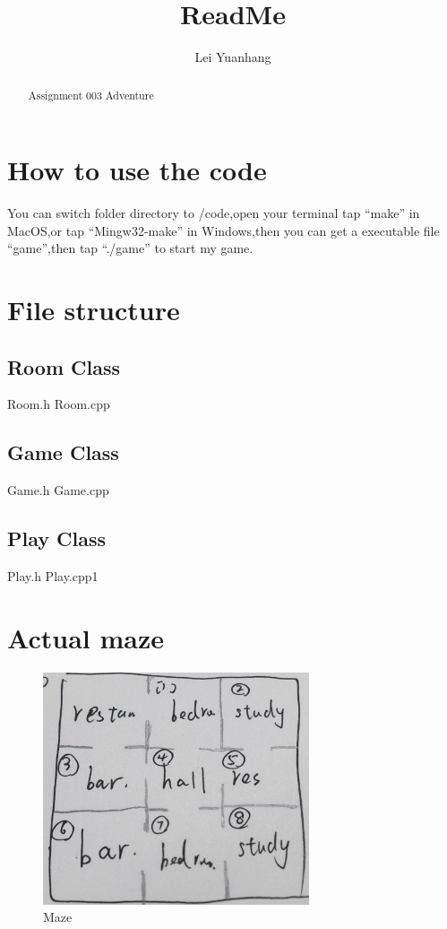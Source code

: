 \documentclass{article}
\title{ReadMe}
\author{Lei Yuanhang}
\begin{document}
\maketitle

\begin{abstract}
Assignment 003 Adventure

\end{abstract}

\section{How to use the code}
You can switch folder directory to /code,open your terminal tap “make” in MacOS,or tap “Mingw32-make” 
in Windows,then you can get a executable file “game”,then tap “./game” to start my game.

\section{File structure}

\subsection{Room Class}
Room.h Room.cpp

\subsection{Game Class}
Game.h Game.cpp

\subsection{Play Class}
Play.h Play.cpp1

\section{Actual maze}

    \begin{figure}[H]
	\centering
	\includegraphics[width=0.7\textwidth]{1.png}
	\caption{\label{OOP3}Maze}
	\end{figure}
\end{document}
